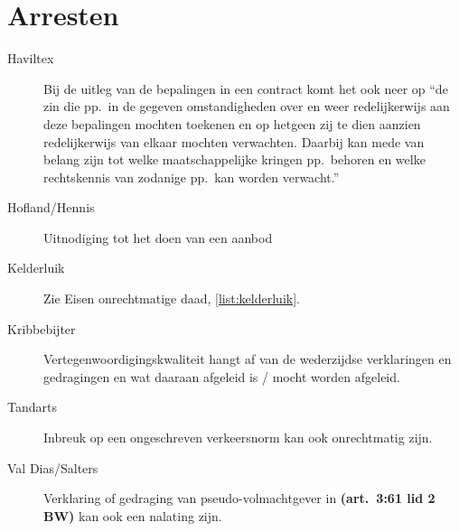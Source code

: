 \documentclass[a4paper]{article}
\newcommand{\art}[1]{\textbf{(art.~#1 BW)}\xspace}
\begin{document}
\section{Arresten}

\begin{description}

  \item[Haviltex] Bij de uitleg van de bepalingen in een contract komt het ook
    neer op ``de zin die pp.~in de gegeven omstandigheden over en weer
    redelijkerwijs aan deze bepalingen mochten toekenen en op hetgeen zij te
    dien aanzien redelijkerwijs van elkaar mochten verwachten. Daarbij kan
    mede van belang zijn tot welke maatschappelijke kringen pp.~behoren en
    welke rechtskennis van zodanige pp.~kan worden verwacht.''

  \item[Hofland/Hennis] Uitnodiging tot het doen van een aanbod

  \item[Kelderluik] Zie Eisen onrechtmatige daad, \ref{list:kelderluik}.

  \item[Kribbebijter] Vertegenwoordigingskwaliteit hangt af van de wederzijdse
    verklaringen en gedragingen en wat daaraan afgeleid is / mocht worden
    afgeleid.

  \item[Tandarts] Inbreuk op een ongeschreven verkeersnorm kan ook
    onrechtmatig zijn.

  \item[Val Dias/Salters] Verklaring of gedraging van pseudo-volmachtgever in
    \art{3:61 lid 2} kan ook een nalating zijn.

\end{description}
\end{document}
